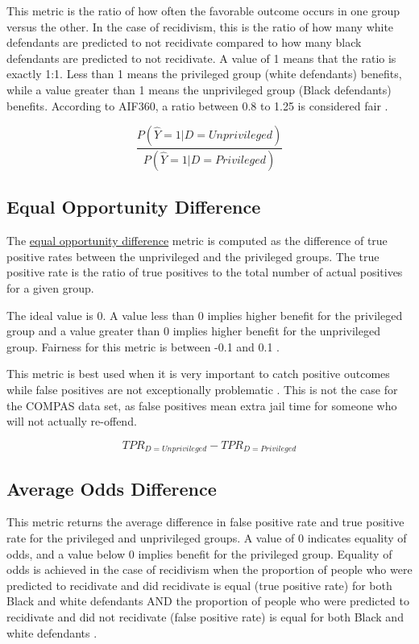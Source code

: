 \documentclass[water,article,submit,moreauthors,pdftex]{mdpi}
\begin{document}
This metric is the ratio of how often the favorable outcome occurs in
one group versus the other. In the case of recidivism, this is the ratio
of how many white defendants are predicted to not recidivate compared to
how many black defendants are predicted to not recidivate. A value of 1
means that the ratio is exactly 1:1. Less than 1 means the privileged
group (white defendants) benefits, while a value greater than 1 means
the unprivileged group (Black defendants) benefits. According to AIF360,
a ratio between 0.8 to 1.25 is considered fair \citep{Ronaghan2019AI}.

\[\frac{P(\hat{Y}=1|D=Unprivileged)}{P(\hat{Y}=1|D=Privileged)}\]

\hypertarget{equal-opportunity-difference}{%
\subsection{Equal Opportunity
Difference}\label{equal-opportunity-difference}}

The
\href{https://developers.google.com/machine-learning/glossary/fairness\#e}{equal
opportunity difference} metric is computed as the difference of true
positive rates between the unprivileged and the privileged groups. The
true positive rate is the ratio of true positives to the total number of
actual positives for a given group.

The ideal value is 0. A value less than 0 implies higher benefit for the
privileged group and a value greater than 0 implies higher benefit for
the unprivileged group. Fairness for this metric is between -0.1 and 0.1
\citep{aif360-oct-2018}.

This metric is best used when it is very important to catch positive
outcomes while false positives are not exceptionally problematic
\citep{Cortez2019How}. This is not the case for the COMPAS data set, as
false positives mean extra jail time for someone who will not actually
re-offend.

\[TPR_{D = Unprivileged} - TPR_{D = Privileged}\]

\hypertarget{average-odds-difference}{%
\subsection{Average Odds Difference}\label{average-odds-difference}}

This metric returns the average difference in false positive rate and
true positive rate for the privileged and unprivileged groups. A value
of 0 indicates equality of odds, and a value below 0 implies benefit for
the privileged group. Equality of odds is achieved in the case of
recidivism when the proportion of people who were predicted to
recidivate and did recidivate is equal (true positive rate) for both
Black and white defendants AND the proportion of people who were
predicted to recidivate and did not recidivate (false positive rate) is
equal for both Black and white defendants \citep{aif360-oct-2018}.
\end{document}
